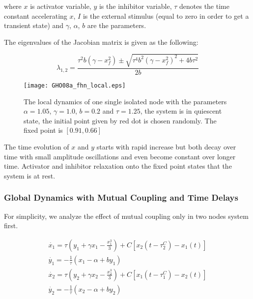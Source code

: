 \documentclass[12pt]{article}
\begin{document}
where $x$ is activator variable, $y$ is the inhibitor variable, $\tau$ denotes the time constant accelerating $x$, $I$ is the external stimulus (equal to zero in order to get a transient state) and $\gamma$, $\alpha$, $b$ are the parameters. 

The eigenvalues of the Jacobian matrix is given as the following:

\begin{equation*}
\lambda_{1,2} = \dfrac{\tau^2 b (\gamma - x_f ^2) \pm \sqrt{\tau^4 b^2 (\gamma- x_f^2)^2 + 4b \tau^2 }} {2b}
\end{equation*}

\begin{figure}[h!]
	\centering
	\texttt{[image: GHO08a\_fhn\_local.eps]}
		\caption{The local dynamics of one single isolated node with the parameters $\alpha = 1.05$, $\gamma=1.0$, $b=0.2$ and $\tau = 1.25$, the system is in quiescent state, the initial point given by red dot is chosen randomly. The fixed point is $[0.91, 0.66]$}
\end{figure}

The time evolution of $x$ and $y$ starts with rapid increase but both decay over time with small amplitude oscillations and even become constant over longer time. Activator and inhibitor relaxation onto the fixed point states that the system is at rest. 
\newpage

\subsubsection{Global Dynamics with Mutual Coupling and Time Delays}

For simplicity, we analyze the effect of mutual coupling only in two nodes system first. 

\begin{subequations}
 \begin{align}\dot{x_1} = \tau (y_1 + \gamma x_1 - \frac{x_1^3}{3}) + C [x_2(t-\tau_2^C)-x_1(t)] \label{eqn: frobenius 19}\\  \dot{y_1} = -\frac{1}{\tau} (x_1 - \alpha + b y_1) \label{eqn: frobenius 20} \\ \dot{x_2}=\tau (y_2 + \gamma x_2 - \frac{x_2^3}{3}) + C [x_1(t-\tau_1^C)-x_2(t)] \label{eqn: frobenius 21} \\  \dot{y_2} = -\frac{1}{\tau} (x_2 - \alpha + by_2) \label{eqn: frobenius 22}\end{align} 
\end{subequations}
\end{document}
